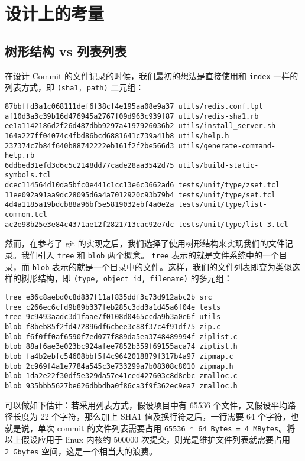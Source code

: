 \section{设计上的考量}\label{ux8bbeux8ba1ux4e0aux7684ux8003ux91cf}

\subsection{树形结构 vs
列表列表}\label{ux6811ux5f62ux7ed3ux6784-vs-ux5217ux8868ux5217ux8868}

在设计 Commit 的文件记录的时候，我们最初的想法是直接使用和
\texttt{index} 一样的列表方式，即 \texttt{(sha1,\ path)} 二元组：

\begin{verbatim}
87bbffd3a1c068111def6f38cf4e195aa08e9a37 utils/redis.conf.tpl
af10d3a3c39b16d476945a2767f09d963c939f87 utils/redis-sha1.rb
ee1a1142186d2f26d487dbb9297a4197926036b2 utils/install_server.sh
164a227ff04074c4fbd86bcd6881641c739a41b8 utils/help.h
237374c7b84f640b88742222eb161f2f2be566d3 utils/generate-command-help.rb
6ddbed31efd3d6c5c2148dd77cade28aa3542d75 utils/build-static-symbols.tcl
dcec114564d10da5bfc0e441c1cc13e6c3662ad6 tests/unit/type/zset.tcl
11ee092a91aa9dc28095d6a4a7012920c93b79b4 tests/unit/type/set.tcl
4d4a1185a19bdcb88a96bf5e5819032ebf4a0e2a tests/unit/type/list-common.tcl
ac2e98b25e3e84c4371ae12f2821713cac92e7dc tests/unit/type/list-3.tcl
\end{verbatim}

然而，在参考了 git
的实现之后，我们选择了使用树形结构来实现我们的文件记录。我们引入
\texttt{tree} 和 \texttt{blob} 两个概念。 \texttt{tree}
表示的就是文件系统中的一个目录，而 \texttt{blob}
表示的就是一个目录中的文件。这样，我们的文件列表即变为类似这样的树形结构，即
\texttt{(type,\ object\ id,\ filename)} 的多元组：

\begin{verbatim}
tree e36c8aebd0c8d837f11af835ddf3c73d912abc2b src
tree c266ec6cfd9b89b337feb285c3dd3a1d45a6f04e tests
tree 9c9493aadc3d1faae7f0108d0465ccda9b3a0e6f utils
blob f8beb85f2fd472896df6cbee3c88f37c4f91df75 zip.c
blob f6f0ff0af6590f7ed077f889da5ea3748489994f ziplist.c
blob 88af6ae3e023bc924afee7852b359f69155aca74 ziplist.h
blob fa4b2ebfc54608bbf5f4c9642018879f317b4a97 zipmap.c
blob 2c969f4a1e7784a545c3e733299a7b08308c8010 zipmap.h
blob 1da2e22f30df5e329da57e41ced427603c8d8ebc zmalloc.c
blob 935bbb5627be626dbbdba0f86ca3f9f362ec9ea7 zmalloc.h
\end{verbatim}

可以做如下估计：若采用列表方式，假设项目中有 65536
个文件，又假设平均路径长度为 22 个字符，那么加上 SHA1
值及换行符之后，一行需要 64 个字符，也就是说，单次 commit
的文件列表需要占用
\texttt{65536\ *\ 64\ Bytes\ =\ 4\ MBytes}。将以上假设应用于 linux
内核约 500000 次提交，则光是维护文件列表就需要占用 \texttt{2\ Gbytes}
空间，这是一个相当大的浪费。

